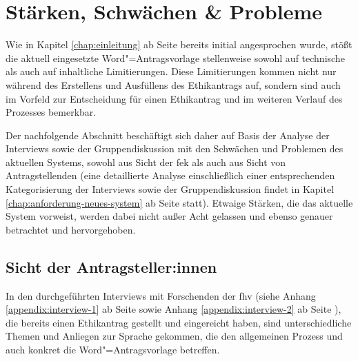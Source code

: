 \documentclass[a4paper,12pt,twoside,numbers=noendperiod]{scrreprt}
\begin{document}
\section{Stärken, Schwächen \& Probleme}
\label{sec:stärken-schwächen-probleme}

Wie in Kapitel \ref{chap:einleitung} ab Seite \pageref{chap:einleitung} bereits initial angesprochen wurde, stößt die aktuell eingesetzte Word"=Antragsvorlage stellenweise sowohl auf technische als auch auf inhaltliche Limitierungen. Diese Limitierungen kommen nicht nur während des Erstellens und Ausfüllens des Ethikantrags auf, sondern sind auch im Vorfeld zur Entscheidung für einen Ethikantrag und im weiteren Verlauf des Prozesses bemerkbar.

Der nachfolgende Abschnitt beschäftigt sich daher auf Basis der Analyse der Interviews sowie der Gruppendiskussion mit den Schwächen und Problemen des aktuellen Systems, sowohl aus Sicht der \ac{fek} als auch aus Sicht von Antragstellenden (eine detaillierte Analyse einschließlich einer entsprechenden Kategorisierung der Interviews sowie der Gruppendiskussion findet in Kapitel \ref{chap:anforderung-neues-system} ab Seite \pageref{chap:anforderung-neues-system} statt). Etwaige Stärken, die das aktuelle System vorweist, werden dabei nicht außer Acht gelassen und ebenso genauer betrachtet und hervorgehoben. 

\subsection{Sicht der Antragsteller:innen}
\label{sub-sec:probleme-sicht-Antragsteller}

In den durchgeführten Interviews mit Forschenden der \ac{fhv} (siehe Anhang \ref{appendix:interview-1} ab Seite \pageref{appendix:interview-1} sowie Anhang \ref{appendix:interview-2} ab Seite \pageref{appendix:interview-2}), die bereits einen Ethikantrag gestellt und eingereicht haben, sind unterschiedliche Themen und Anliegen zur Sprache gekommen, die den allgemeinen Prozess und auch konkret die Word"=Antragsvorlage betreffen.
\end{document}

